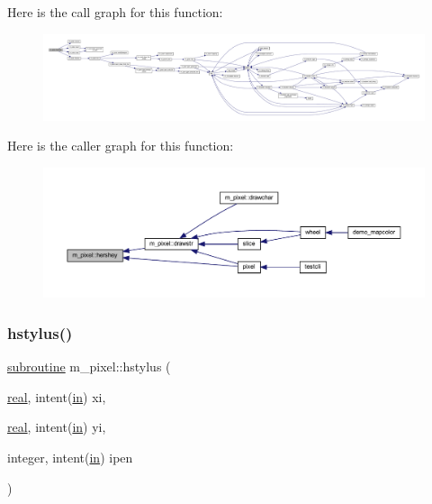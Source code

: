 Here is the call graph for this function\+:
\nopagebreak
\begin{figure}[H]
\begin{center}
\leavevmode
\includegraphics[width=350pt]{namespacem__pixel_a80dc3cb149287470a9837de8dd3f05bc_cgraph}
\end{center}
\end{figure}
Here is the caller graph for this function\+:
\nopagebreak
\begin{figure}[H]
\begin{center}
\leavevmode
\includegraphics[width=350pt]{namespacem__pixel_a80dc3cb149287470a9837de8dd3f05bc_icgraph}
\end{center}
\end{figure}
\mbox{\label{namespacem__pixel_a15c5daa9ab477991c2c6e17741cf40eb}} 
\subsubsection{\texorpdfstring{hstylus()}{hstylus()}}
{\footnotesize\ttfamily \hyperlink{M__stopwatch_83_8txt_acfbcff50169d691ff02d4a123ed70482}{subroutine} m\+\_\+pixel\+::hstylus (\begin{DoxyParamCaption}\item[{\hyperlink{read__watch_83_8txt_abdb62bde002f38ef75f810d3a905a823}{real}, intent(\hyperlink{M__journal_83_8txt_afce72651d1eed785a2132bee863b2f38}{in})}]{xi,  }\item[{\hyperlink{read__watch_83_8txt_abdb62bde002f38ef75f810d3a905a823}{real}, intent(\hyperlink{M__journal_83_8txt_afce72651d1eed785a2132bee863b2f38}{in})}]{yi,  }\item[{integer, intent(\hyperlink{M__journal_83_8txt_afce72651d1eed785a2132bee863b2f38}{in})}]{ipen }\end{DoxyParamCaption})\hspace{0.3cm}{\ttfamily [private]}}



